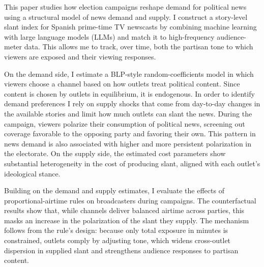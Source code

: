 \documentclass[12pt]{article}
\begin{document}
This paper studies how election campaigns reshape demand for political news using a structural model of news demand and supply. I construct a story-level slant index for Spanish prime-time TV newscasts by combining machine learning with large language models (LLMs) and match it to high-frequency audience-meter data. This allows me to track, over time, both the partisan tone to which viewers are exposed and their viewing responses.





On the demand side, I estimate a BLP-style random-coefficients model in which viewers choose a channel based on how outlets treat political content. Since content is chosen by outlets in equilibrium, it is endogenous. In order to identify demand preferences I rely on supply shocks that come from day-to-day changes in the available stories and limit how much outlets can slant the news. During the campaign, viewers polarize their consumption of political news, screening out coverage favorable to the opposing party and favoring their own. This pattern in news demand is also associated with higher and more persistent polarization in the electorate. On the supply side, the estimated cost parameters show substantial heterogeneity in the cost of producing slant, aligned with each outlet’s ideological stance.


Building on the demand and supply estimates, I evaluate the effects of  proportional-airtime rules on broadcasters during campaigns. The counterfactual results show that, while channels deliver balanced airtime across parties, this masks an increase in the polarization of the slant they supply. The mechanism follows from the rule’s design: because only total exposure in minutes is constrained, outlets comply by adjusting tone, which widens cross-outlet dispersion in supplied slant and strengthens audience responses to partisan content.
\end{document}
